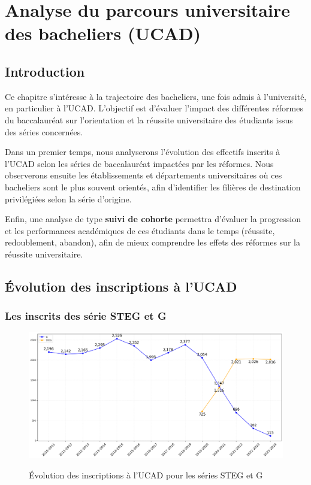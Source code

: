 \chapter{Analyse du parcours universitaire des bacheliers (UCAD)}

\section{Introduction}

Ce chapitre s'intéresse à la trajectoire des bacheliers, une fois admis à l'université, en particulier à l'UCAD. 
L’objectif est d’évaluer l’impact des différentes réformes du baccalauréat sur l’orientation et la réussite universitaire des étudiants issus des séries concernées.

Dans un premier temps, nous analyserons l’évolution des effectifs inscrits à l’UCAD selon les séries de baccalauréat impactées par les réformes.
Nous observerons ensuite les établissements et départements universitaires où ces bacheliers sont le plus souvent orientés, afin d’identifier les filières de destination privilégiées selon la série d’origine.

Enfin, une analyse de type \textbf{suivi de cohorte} permettra d’évaluer la progression et les performances académiques de ces étudiants dans le temps (réussite, redoublement, abandon), afin de mieux comprendre les effets des réformes sur la réussite universitaire.

\section{Évolution des inscriptions à l'UCAD}

\newpage
\subsection{Les inscrits des série STEG et G}

\begin{figure}[ht]
\centering
\caption{Évolution des inscriptions à l'UCAD pour les séries STEG et G}
\includegraphics[width=1\textwidth]{figure/Inscrits_ucad_STEG.png}
\label{fig:inscrits_ucad_steg}
\end{figure}

